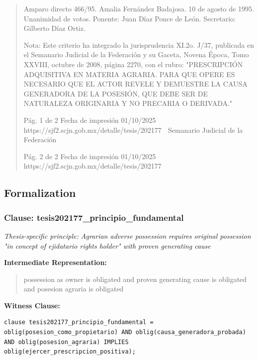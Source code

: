 \documentclass[11pt,a4paper]{article}
\begin{document}
\begin{quote}
Amparo directo 466/95. Amalia Fernández Badajosa. 10 de agosto de 1995. Unanimidad de votos.
Ponente: Juan Díaz Ponce de León. Secretario: Gilberto Díaz Ortiz.

Nota: Este criterio ha integrado la jurisprudencia XI.2o. J/37, publicada en el Semanario Judicial de
la Federación y su Gaceta, Novena Época, Tomo XXVIII, octubre de 2008, página 2270, con el
rubro: "PRESCRIPCIÓN ADQUISITIVA EN MATERIA AGRARIA. PARA QUE OPERE ES
NECESARIO QUE EL ACTOR REVELE Y DEMUESTRE LA CAUSA GENERADORA DE LA
POSESIÓN, QUE DEBE SER DE NATURALEZA ORIGINARIA Y NO PRECARIA O DERIVADA."




                                             Pág. 1 de 2             Fecha de impresión 01/10/2025
  https://sjf2.scjn.gob.mx/detalle/tesis/202177
                                                Semanario Judicial de la Federación




                                           Pág. 2 de 2       Fecha de impresión 01/10/2025
https://sjf2.scjn.gob.mx/detalle/tesis/202177

\end{quote}

\subsection{Formalization}

\subsubsection{Clause: tesis202177\_principio\_fundamental}

\textit{Thesis-specific principle: Agrarian adverse possession requires original possession "in concept of ejidatario rights holder" with proven generating cause}

\textbf{Intermediate Representation:}

\begin{quote}
possession as owner is obligated and proven generating cause is obligated and posesion agraria is obligated
\end{quote}

\textbf{Witness Clause:}

\begin{lstlisting}[style=witnessstyle, language=Witness]
clause tesis202177_principio_fundamental = oblig(posesion_como_propietario) AND oblig(causa_generadora_probada) AND oblig(posesion_agraria) IMPLIES oblig(ejercer_prescripcion_positiva);
\end{lstlisting}
\end{document}

